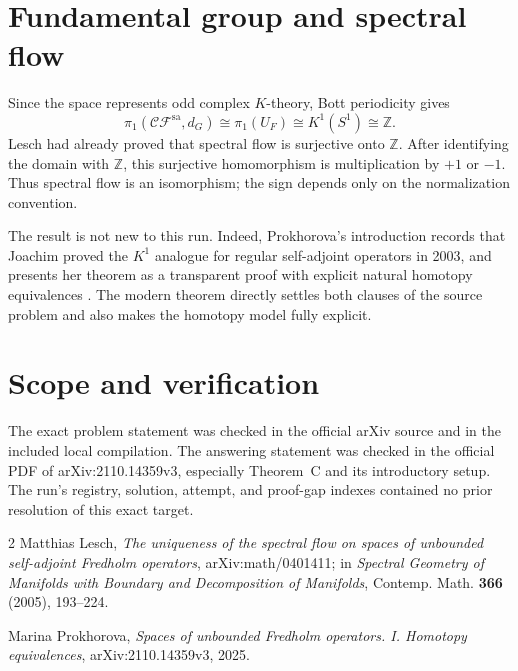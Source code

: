 \documentclass[11pt]{article}
\begin{document}
\section*{Fundamental group and spectral flow}

Since the space represents odd complex $K$-theory, Bott periodicity gives
\[
  \pi_1(\mathcal{CF}^{\mathrm{sa}},d_G)
  \cong \pi_1(U_F)
  \cong K^1(S^1)
  \cong \mathbb Z.
\]
Lesch had already proved that spectral flow is surjective onto $\mathbb Z$.
After identifying the domain with $\mathbb Z$, this surjective homomorphism is
multiplication by $+1$ or $-1$.  Thus spectral flow is an isomorphism; the
sign depends only on the normalization convention.

The result is not new to this run.  Indeed, Prokhorova's introduction records
that Joachim proved the $K^1$ analogue for regular self-adjoint operators in
2003, and presents her theorem as a transparent proof with explicit natural
homotopy equivalences \cite[pp.~2--3]{answer}.  The modern theorem directly
settles both clauses of the source problem and also makes the homotopy model
fully explicit.

\section*{Scope and verification}

The exact problem statement was checked in the official arXiv source and in
the included local compilation.  The answering statement was checked in the
official PDF of arXiv:2110.14359v3, especially Theorem~C and its introductory
setup.  The run's registry, solution, attempt, and proof-gap indexes contained
no prior resolution of this exact target.

\begin{thebibliography}{2}
Matthias Lesch,
\emph{The uniqueness of the spectral flow on spaces of unbounded
self-adjoint Fredholm operators},
arXiv:math/0401411; in \emph{Spectral Geometry of Manifolds with Boundary and
Decomposition of Manifolds}, Contemp. Math. \textbf{366} (2005), 193--224.

Marina Prokhorova,
\emph{Spaces of unbounded Fredholm operators. I. Homotopy equivalences},
arXiv:2110.14359v3, 2025.
\end{thebibliography}
\end{document}
